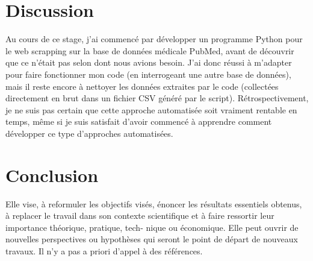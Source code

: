 \documentclass{book}
\begin{document}
\thispagestyle{fancy}

\chapter{\label{Quatrième Chapitre}Discussion}
\noindent
Au cours de ce stage, j'ai commencé par développer un programme Python pour le
web scrapping sur la base de données médicale PubMed, avant de découvrir que ce
n'était pas selon dont nous avions besoin. J'ai donc réussi à m'adapter pour
faire fonctionner mon code (en interrogeant une autre base de données), mais il
reste encore à nettoyer les données extraites par le code (collectées
directement en brut dans un fichier CSV généré par le script).
Rétrospectivement, je ne suis pas certain que cette approche automatisée soit
vraiment rentable en temps, même si je suis satisfait d'avoir commencé à
apprendre comment développer ce type d'approches automatisées.

\lipsum[1]

\thispagestyle{fancy}

\chapter{\label{Cinquième Chapitre}Conclusion}
Elle vise, à reformuler les objectifs visés, énoncer les résultats essentiels
obtenus, à replacer le
travail dans son contexte scientifique et à faire ressortir leur importance
théorique, pratique, tech-
nique ou économique. Elle peut ouvrir de nouvelles perspectives ou hypothèses
qui seront le point
de départ de nouveaux travaux. Il n'y a pas a priori d'appel à des références.

\thispagestyle{fancy}

\newpage


\cite{clef1}
\thispagestyle{fancy}


\newpage
\thispagestyle{empty}
\mbox{} %
\end{document}
